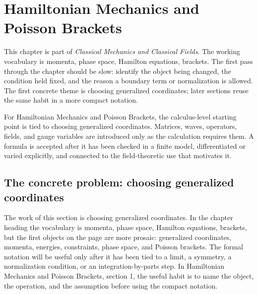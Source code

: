 \chapter{Hamiltonian Mechanics and Poisson Brackets}


This chapter is part of \emph{Classical Mechanics and Classical Fields}.  The working vocabulary is momenta, phase space, Hamilton equations, brackets.  The first pass through the chapter should be slow: identify the object being changed, the condition held fixed, and the reason a boundary term or normalization is allowed.  The first concrete theme is choosing generalized coordinates; later sections reuse the same habit in a more compact notation.

For Hamiltonian Mechanics and Poisson Brackets, the calculus-level starting point is tied to choosing generalized coordinates.  Matrices, waves, operators, fields, and gauge variables are introduced only as the calculation requires them.  A formula is accepted after it has been checked in a finite model, differentiated or varied explicitly, and connected to the field-theoretic use that motivates it.

\section{The concrete problem: choosing generalized coordinates}













The work of this section is choosing generalized coordinates.  In the chapter heading the vocabulary is momenta, phase space, Hamilton equations, brackets, but the first objects on the page are more prosaic: generalized coordinates, momenta, energies, constraints, phase space, and Poisson brackets.  The formal notation will be useful only after it has been tied to a limit, a symmetry, a normalization condition, or an integration-by-parts step.  In Hamiltonian Mechanics and Poisson Brackets, section 1, the useful habit is to name the object, the operation, and the assumption before using the compact notation.

